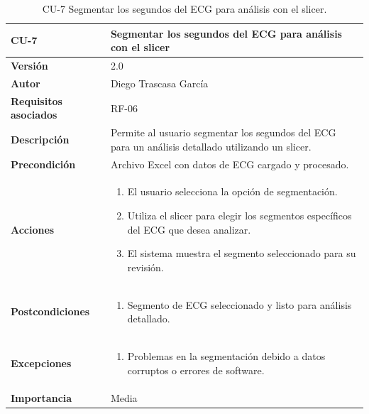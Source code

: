 \begin{table}[p]
	\centering
	\begin{tabularx}{\linewidth}{ p{} p{} }
		\toprule
		\textbf{CU-7}    & \textbf{Segmentar los segundos del ECG para análisis con el slicer}\\
		\toprule
		\textbf{Versión}              & 2.0    \\
		\textbf{Autor}                & Diego Trascasa García \\
		\textbf{Requisitos asociados} & RF-06 \\
		\textbf{Descripción}          & Permite al usuario segmentar los segundos del ECG para un análisis detallado utilizando un slicer. \\
		\textbf{Precondición}         & Archivo Excel con datos de ECG cargado y procesado. \\
		\textbf{Acciones}             &
		\begin{enumerate}
			\item El usuario selecciona la opción de segmentación.
			\item Utiliza el slicer para elegir los segmentos específicos del ECG que desea analizar.
			\item El sistema muestra el segmento seleccionado para su revisión.
		\end{enumerate}\\
		\textbf{Postcondiciones}      & 
		\begin{enumerate}
			\item Segmento de ECG seleccionado y listo para análisis detallado.
		\end{enumerate}\\
		\textbf{Excepciones}          & 
		\begin{enumerate}
			\item Problemas en la segmentación debido a datos corruptos o errores de software.
		\end{enumerate}\\
		\textbf{Importancia}          & Media \\
		\bottomrule
	\end{tabularx}
	\caption{CU-7 Segmentar los segundos del ECG para análisis con el slicer.}
    \label{CU-7}
\end{table}


